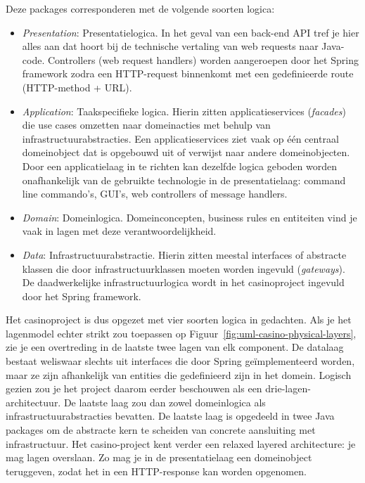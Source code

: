 Deze packages corresponderen met de volgende soorten logica:
\begin{itemize}
    \item \emph{Presentation}: Presentatielogica. In het geval van een back-end API tref
    je hier alles aan dat hoort bij de technische vertaling van web requests naar Java-code. 
    Controllers (web request handlers) worden aangeroepen door het Spring framework 
    zodra een HTTP-request binnenkomt met een gedefinieerde route (HTTP-method + URL).
    \item \emph{Application}: Taakspecifieke logica. Hierin zitten applicatieservices (\emph{facades}) 
    die use cases omzetten naar domeinacties met behulp van infrastructuurabstracties. Een applicatieservices
    ziet vaak op één centraal domeinobject dat is opgebouwd uit of verwijst naar andere domeinobjecten.
    Door een applicatielaag in te richten kan dezelfde logica geboden worden onafhankelijk van de gebruikte 
    technologie in de presentatielaag: command line commando's, GUI's, web controllers of message handlers.
    \item \emph{Domain}: Domeinlogica. Domeinconcepten, business rules en entiteiten vind je vaak in lagen 
    met deze verantwoordelijkheid.
    \item \emph{Data}: Infrastructuurabstractie. Hierin zitten meestal interfaces of abstracte klassen die door
    infrastructuurklassen moeten worden ingevuld (\emph{gateways}). De daadwerkelijke infrastructuurlogica 
    wordt in het casinoproject ingevuld door het Spring framework.
\end{itemize}

Het casinoproject is dus opgezet met vier soorten logica in gedachten. Als je het 
lagenmodel echter strikt zou toepassen op Figuur~\ref{fig:uml-casino-physical-layers}, 
zie je een overtreding in de laatste twee lagen van elk component. 
De datalaag bestaat weliswaar slechts uit interfaces die door 
Spring geïmplementeerd worden, maar ze zijn afhankelijk van entities die
gedefinieerd zijn in het domein. Logisch gezien zou je het project daarom 
eerder beschouwen als een drie-lagen-architectuur. De laatste laag zou dan zowel
domeinlogica als infrastructuurabstracties bevatten. De laatste laag is opgedeeld 
in twee Java packages om de abstracte kern te scheiden van concrete 
aansluiting met infrastructuur. Het casino-project kent verder 
een relaxed layered architecture: je mag lagen overslaan.
Zo mag je in de presentatielaag een domeinobject teruggeven,
zodat het in een HTTP-response kan worden opgenomen.

